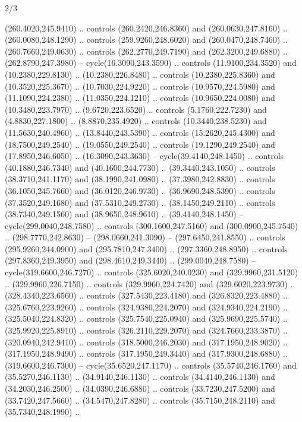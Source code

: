 \begin{flagdescription}{2/3}
\begin{scope}[xshift=0.5\flaglength,yshift=0.5\flagwidth,scale=\stretchfactor]
\begin{scope}[scale=0.001645\flagwidth,yshift=65mm,xshift=-63mm]
\begin{scope}[y=0.80pt, x=0.80pt, yscale=-1,]
\begin{scope}[cm={{1.33333,0.0,0.0,1.33333,(0.0,1e-05)}}]
  (260.4020,245.9410) .. controls (260.2420,246.8360) and (260.0630,247.8160) ..
  (260.0080,248.1290) .. controls (259.9260,248.6020) and (260.0470,248.7460) ..
  (260.7660,249.0630) .. controls (262.2770,249.7190) and (262.3200,249.6880) ..
  (262.8790,247.3980) -- cycle(16.3090,243.3590) .. controls (11.9100,234.3520)
  and (10.2380,229.8130) .. (10.2380,226.8480) .. controls (10.2380,225.8360)
  and (10.3520,225.3670) .. (10.7030,224.9220) .. controls (10.9570,224.5980)
  and (11.1090,224.2380) .. (11.0350,224.1210) .. controls (10.9650,224.0080)
  and (10.3480,223.7970) .. (9.6720,223.6520) .. controls (5.1760,222.7230) and
  (4.8830,227.1800) .. (8.8870,235.4920) .. controls (10.3440,238.5230) and
  (11.5630,240.4960) .. (13.8440,243.5390) .. controls (15.2620,245.4300) and
  (18.7500,249.2540) .. (19.0550,249.2540) .. controls (19.1290,249.2540) and
  (17.8950,246.6050) .. (16.3090,243.3630) -- cycle(39.4140,248.1450) ..
  controls (40.1880,246.7340) and (40.1600,244.7730) .. (39.3440,243.1050) ..
  controls (38.3710,241.1170) and (38.1990,241.0980) .. (37.3980,242.8830) ..
  controls (36.1050,245.7660) and (36.0120,246.9730) .. (36.9690,248.5390) ..
  controls (37.3520,249.1680) and (37.5310,249.2730) .. (38.1450,249.2110) ..
  controls (38.7340,249.1560) and (38.9650,248.9610) .. (39.4140,248.1450) --
  cycle(299.0040,248.7580) .. controls (300.1600,247.5160) and
  (300.0900,245.7540) .. (298.7770,242.8630) -- (298.0660,241.3090) --
  (297.6450,241.8550) .. controls (295.9260,244.0900) and (295.7810,247.3400) ..
  (297.3360,248.8950) .. controls (297.8360,249.3950) and (298.4610,249.3440) ..
  (299.0040,248.7580) -- cycle(319.6600,246.7270) .. controls
  (325.6020,240.0230) and (329.9960,231.5120) .. (329.9960,226.7150) .. controls
  (329.9960,224.7420) and (329.6020,223.9730) .. (328.4340,223.6560) .. controls
  (327.5430,223.4180) and (326.8320,223.4880) .. (325.6760,223.9260) .. controls
  (324.9380,224.2070) and (324.9340,224.2190) .. (325.5040,224.8320) .. controls
  (325.7540,225.0940) and (325.9690,225.5740) .. (325.9920,225.8910) .. controls
  (326.2110,229.2070) and (324.7660,233.3870) .. (320.0940,242.9410) .. controls
  (318.5000,246.2030) and (317.1950,248.9020) .. (317.1950,248.9490) .. controls
  (317.1950,249.3440) and (317.9300,248.6880) .. (319.6600,246.7300) --
  cycle(35.6520,247.1170) .. controls (35.5740,246.1760) and (35.5270,246.1130)
  .. (34.9140,246.1130) .. controls (34.4140,246.1130) and (34.2030,246.2500) ..
  (34.0390,246.6880) .. controls (33.7230,247.5200) and (33.7420,247.5660) ..
  (34.5470,247.8280) .. controls (35.7150,248.2110) and (35.7340,248.1990) ..

\end{scope}
\end{scope}
\end{scope}
\end{scope}
\end{flagdescription}

